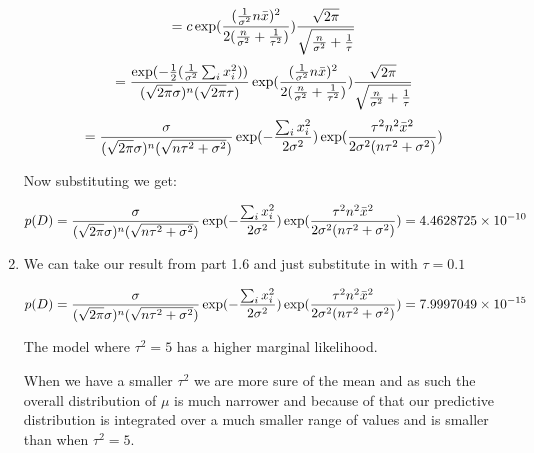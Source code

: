 \documentclass[submit]{harvardml}
\begin{document}
\begin{enumerate}
\begin{equation*}
     \end{equation*}
     \begin{equation*}
        = c \exp(\frac{(\frac{1}{\sigma^2}n\Bar{x})^2}{2(\frac{n}{\sigma^2} + \frac{1}{\tau^2})}) \frac{\sqrt{2\pi}}{\sqrt{\frac{n}{\sigma^2}+\frac{1}{\tau}}}
     \end{equation*}
     \begin{equation*}
        = \frac{\exp(-\frac{1}{2}(\frac{1}{\sigma^2}\sum_{i} x_i^2))}{(\sqrt{2\pi}\sigma)^n(\sqrt{2\pi}\tau)} \exp(\frac{(\frac{1}{\sigma^2}n\Bar{x})^2}{2(\frac{n}{\sigma^2} + \frac{1}{\tau^2})}) \frac{\sqrt{2\pi}}{\sqrt{\frac{n}{\sigma^2}+\frac{1}{\tau}}}
     \end{equation*}
     \begin{equation*}
        = \frac{\sigma}{(\sqrt{2\pi}\sigma)^n(\sqrt{n\tau^2 + \sigma^2})}\exp(-\frac{\sum_{i} x_i^2}{2\sigma^2})\exp(\frac{\tau^2 n^2\Bar{x}^2}{2\sigma^2(n\tau^2 + \sigma^2)})
     \end{equation*}
     \begin{center}
         Now substituting we get:
     \end{center}
     \begin{equation*}
        p(D) = \frac{\sigma}{(\sqrt{2\pi}\sigma)^n(\sqrt{n\tau^2 + \sigma^2})}\exp(-\frac{\sum_{i} x_i^2}{2\sigma^2})\exp(\frac{\tau^2 n^2\Bar{x}^2}{2\sigma^2(n\tau^2 + \sigma^2)}) = 4.4628725 \times 10^{-10}
     \end{equation*}
     \item \hspace{2cm}
     \begin{center}
         We can take our result from part 1.6 and just substitute in with $\tau = 0.1$
     \end{center}
     \begin{equation*}
        p(D) = \frac{\sigma}{(\sqrt{2\pi}\sigma)^n(\sqrt{n\tau^2 + \sigma^2})}\exp(-\frac{\sum_{i} x_i^2}{2\sigma^2})\exp(\frac{\tau^2 n^2\Bar{x}^2}{2\sigma^2(n\tau^2 + \sigma^2)}) = 7.9997049 \times 10^{-15}
     \end{equation*}
     
     The model where $\tau^2 = 5$ has a higher marginal likelihood.
     
     When we have a smaller $\tau^2$ we are more sure of the mean and as such the overall distribution of $\mu$ is much narrower and because of that our predictive distribution is integrated over a much smaller range of values and is smaller than when $\tau^2 = 5$.
 \end{enumerate}
\end{document}
